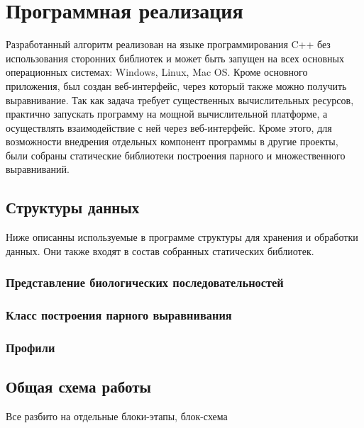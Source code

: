 \newpage

\section[Программная реализация]{\large \centering Программная реализация}
\hspace{\parindent} Разработанный алгоритм реализован на языке программирования C++ без использования сторонних библиотек и может быть запущен на всех основных операционных системах: Windows, Linux, Mac OS. Кроме основного приложения, был создан веб-интерфейс, через который также можно получить выравнивание. Так как задача требует существенных вычислительных ресурсов, практично запускать программу на мощной вычислительной платформе, а осуществлять взаимодействие с ней через веб-интерфейс. Кроме этого, для возможности внедрения отдельных компонент программы в другие проекты, были собраны статические библиотеки построения парного и множественного выравниваний.

\subsection[Структуры данных]{\large Структуры данных}
\hspace{\parindent} Ниже описанны используемые в программе структуры для хранения и обработки данных. Они также входят в состав собранных статических библиотек.

\subsubsection[Представление биологических последовательностей]{\large Представление биологических последовательностей}
\hspace{\parindent} 

\subsubsection[Класс построения парного выравнивания]{\large Класс построения парного выравнивания}
\hspace{\parindent} 

\subsubsection[Профили]{\large Профили}
\hspace{\parindent} 

\subsection[Общая схема работы]{\large Общая схема работы}
\hspace{\parindent} Все разбито на отдельные блоки-этапы, блок-схема

